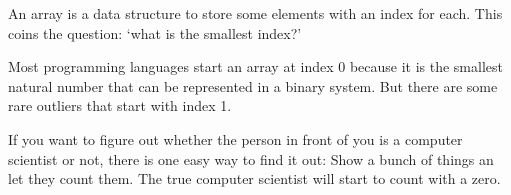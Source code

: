 
An array is a data structure to store some elements with an index for each.
This coins the question: `what is the smallest index?'

Most programming languages start an array at index 0 because it is the smallest natural number that can be represented in a binary system. But there are some rare outliers that start with index 1.

If you want to figure out whether the person in front of you is a computer scientist or not, there is one easy way to find it out:
Show a bunch of things an let they count them. The true computer scientist will start to count with a zero.

